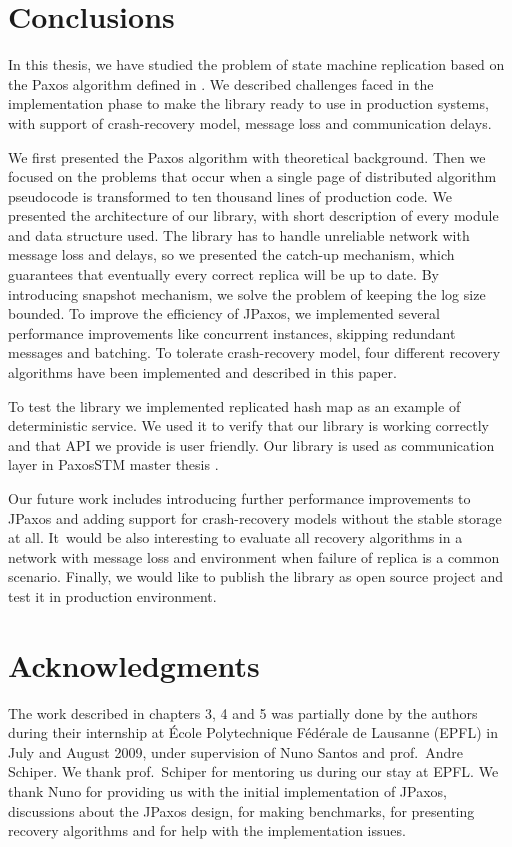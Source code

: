 \chapter{Conclusions}

In this thesis, we have studied the problem of state machine replication based
on the Paxos algorithm defined in \cite{Lam98}. We described challenges faced in
the implementation phase to make the library ready to use in production systems,
with support of crash-recovery model, message loss and communication delays.

We first presented the Paxos algorithm with theoretical background. Then we
focused on the problems that occur when a single page of distributed algorithm
pseudocode is transformed to ten thousand lines of production code. We
presented the architecture of our library, with short description of every
module and data structure used. The library has to handle unreliable network
with message loss and delays, so we presented the catch-up mechanism, which
guarantees that eventually every correct replica will be up to date. By
introducing snapshot mechanism, we solve the problem of keeping the log size
bounded. To improve the efficiency of JPaxos, we implemented several
performance improvements like concurrent instances, skipping redundant messages
and batching. To tolerate crash-recovery model, four different recovery
algorithms have been implemented and described in this paper.

To test the library we implemented replicated hash map as an example of
deterministic service. We used it to verify that our library is working
correctly and that API we provide is user friendly. Our library is used as 
communication layer in PaxosSTM master thesis \cite{Tad10}.

Our future work includes introducing further performance improvements to JPaxos
and adding support for crash-recovery models without the stable storage at all.
It~would be also interesting to evaluate all recovery algorithms in a network
with message loss and environment when failure of replica is a common scenario.
Finally, we would like to publish the library as open source project and test
it in production environment.

\chapter{Acknowledgments}

The work described in chapters 3, 4 and 5 was partially done by the authors
during their internship at École Polytechnique Fédérale de Lausanne (EPFL) in
July and August 2009, under supervision of Nuno Santos and prof.\ Andre
Schiper. We thank prof.\ Schiper for mentoring us during our stay at EPFL. We
thank Nuno for providing us with the initial implementation of JPaxos,
discussions about the JPaxos design, for making benchmarks, for presenting
recovery algorithms and for help with the implementation issues.

